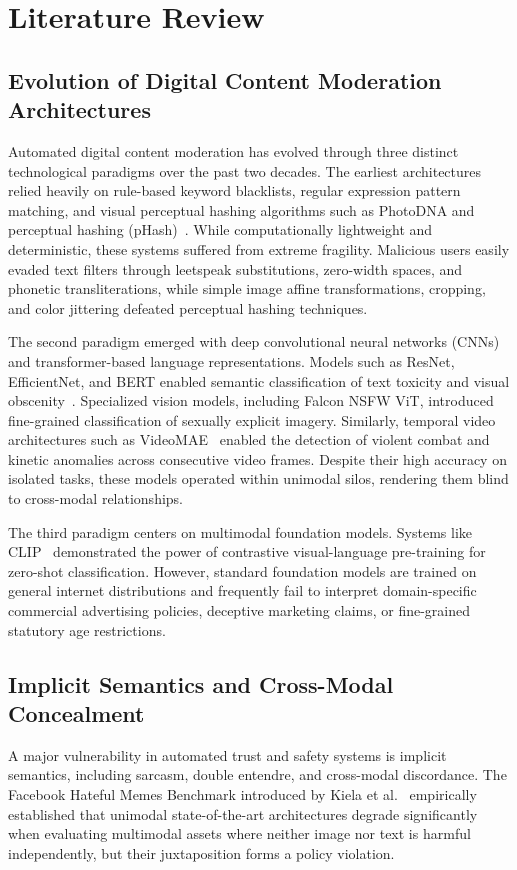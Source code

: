\documentclass[12pt,a4paper]{report}
\begin{document}
\chapter{Literature Review}
\label{ch:lit_review}

\section{Evolution of Digital Content Moderation Architectures}
Automated digital content moderation has evolved through three distinct technological paradigms over the past two decades. The earliest architectures relied heavily on rule-based keyword blacklists, regular expression pattern matching, and visual perceptual hashing algorithms such as PhotoDNA and perceptual hashing (pHash)~\cite{kiela2020hateful}. While computationally lightweight and deterministic, these systems suffered from extreme fragility. Malicious users easily evaded text filters through leetspeak substitutions, zero-width spaces, and phonetic transliterations, while simple image affine transformations, cropping, and color jittering defeated perceptual hashing techniques.

The second paradigm emerged with deep convolutional neural networks (CNNs) and transformer-based language representations. Models such as ResNet, EfficientNet, and BERT enabled semantic classification of text toxicity and visual obscenity~\cite{devlin2018bert}. Specialized vision models, including Falcon NSFW ViT, introduced fine-grained classification of sexually explicit imagery. Similarly, temporal video architectures such as VideoMAE~\cite{tong2022videomae} enabled the detection of violent combat and kinetic anomalies across consecutive video frames. Despite their high accuracy on isolated tasks, these models operated within unimodal silos, rendering them blind to cross-modal relationships.

The third paradigm centers on multimodal foundation models. Systems like CLIP~\cite{radford2021learning} demonstrated the power of contrastive visual-language pre-training for zero-shot classification. However, standard foundation models are trained on general internet distributions and frequently fail to interpret domain-specific commercial advertising policies, deceptive marketing claims, or fine-grained statutory age restrictions.

\section{Implicit Semantics and Cross-Modal Concealment}
A major vulnerability in automated trust and safety systems is implicit semantics, including sarcasm, double entendre, and cross-modal discordance. The Facebook Hateful Memes Benchmark introduced by Kiela et al.~\cite{kiela2020hateful} empirically established that unimodal state-of-the-art architectures degrade significantly when evaluating multimodal assets where neither image nor text is harmful independently, but their juxtaposition forms a policy violation.
\end{document}
